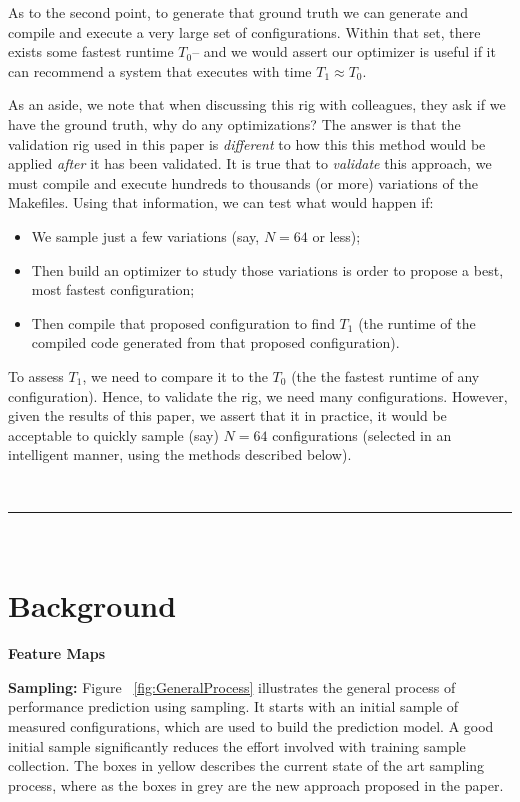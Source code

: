 \documentclass{sig-alternative}
\newcommand{\bi}{\begin{itemize}}%
\newcommand{\ei}{\end{itemize}}
\begin{document}
As to the second point, to generate that ground truth we can generate and compile and execute
a  very large set of configurations. Within that set, there exists some fastest runtime $T_0$--
and we would assert our optimizer is useful if it can recommend a system that executes
with time $T_1 \approx T_0$.

As an aside, we note that when discussing this rig with colleagues, they ask if we have the ground truth, why do any optimizations? The answer is that the validation rig used
in this paper is {\em different} to how this this method would be applied {\em after}
it has been validated. It is true that to {\em validate} this approach, we must compile
and execute hundreds to thousands (or more) variations of the Makefiles. Using that information,
we can test what would happen if:
\bi
\item We sample just a few variations (say, $N=64$ or less);
\item Then build an optimizer to study those variations is order to propose a best, most fastest configuration;
\item Then compile that proposed configuration to find $T_1$ (the runtime of the compiled code generated from that proposed configuration).
\ei
To assess $T_1$, we need to compare it to the $T_0$ (the  the fastest runtime of any configuration). Hence, to validate the rig, we need many configurations. However, given the results of this paper, we assert that it
in practice, it
would be acceptable to quickly sample (say) $N=64$ configurations (selected in an intelligent manner,  using the methods described below).

~\hrule~
\section{Background}

\textbf{Feature Maps}

    \textbf{Sampling: } Figure ~\ref{fig:GeneralProcess} illustrates the general process of performance prediction using sampling. It starts with an initial sample of measured configurations, which are used to build the prediction model. A good initial sample significantly reduces the effort involved with training sample collection. The boxes in yellow describes the current state of the art sampling process, where as the boxes in grey are the new approach proposed in the paper. 
    
\end{document}
